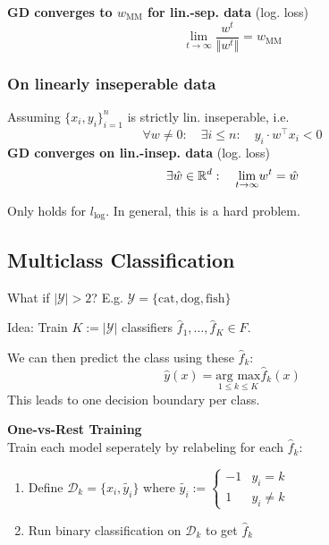 \theorem \textbf{GD converges to $w_\text{MM}$ for lin.-sep. data} (log. loss)
$$
    \underset{t\to\infty}{\lim}\frac{w^t}{\Vert w^t \Vert} = w_\text{MM}
$$

\subsubsection{On linearly inseperable data}

Assuming $\{x_i,y_i\}_{i=1}^n$ is strictly lin. inseperable, i.e.
$$
    \forall w \neq 0:\quad \exists i \leq n: \quad y_i \cdot w^\top x_i < 0
$$
\theorem \textbf{GD converges on lin.-insep. data} (log. loss)
$$
    \exists \hat{w} \in \mathbb{R}^d: \quad \underset{t\to\infty}{\lim}w^t = \hat{w}
$$

\remark Only holds for $l_\text{log}$. In general, this is a hard problem.

\newpage

\subsection{Multiclass Classification}

What if $|\mathcal{Y}| > 2$? E.g. $\mathcal{Y} = \{\text{cat}, \text{dog}, \text{fish} \}$

Idea: Train $K := |\mathcal{Y}|$ classifiers $\hat{f}_1,\ldots,\hat{f}_K \in F$.\\

We can then predict the class using these $\hat{f}_k$:
$$
    \hat{y}(x) = \underset{1\leq k\leq K}{\text{arg max}} \hat{f}_k(x)
$$
This leads to one decision boundary per class.

 \textbf{One-vs-Rest Training}\\
Train each model seperately by relabeling for each $\hat{f}_k$:
\begin{enumerate}
    \item Define $\mathcal{D}_k = \{x_i, \tilde{y_i}\}$ where $\tilde{y_i} := \begin{cases}
        -1  & y_i=k \\
        1   & y_i\neq k
    \end{cases}$
    \item Run binary classification on $\mathcal{D}_k$ to get $\hat{f}_k$
\end{enumerate}

